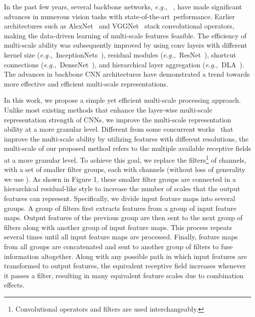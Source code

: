 \documentclass[10pt,journal,cspaper,compsoc]{IEEEtran}
\newcommand{\CheckRmv}[1]{}
\newcommand{\figref}[1]{Figure 1}\newcommand{\tabref}[1]{Table 1}\newcommand{\secref}[1]{Section 1}
\newcommand{\CheckRmv}[1]{#1}
\newcommand{\figref}[1]{Fig.~\ref{#1}}\newcommand{\tabref}[1]{Table~\ref{#1}}\newcommand{\secref}[1]{Sec.~\ref{#1}}
\newcommand{\ourM}{{Res2Net}}
\newcommand{\sArt}{{state-of-the-art~}}
\def\eg{\emph{e.g.,~}}
\begin{document}
In the past few years, several backbone networks, \eg
\cite{krizhevsky2012imagenet,simonyan2014very,szegedy2015going,he2016deep,
huang2017densely,Chollet_2017_CVPR,xie2017aggregated,chen2017dual,
yu2018deep,hu2018senet},
have made significant advances in numerous vision tasks with 
\sArt performance.
Earlier architectures such as AlexNet~\cite{krizhevsky2012imagenet} and
VGGNet~\cite{simonyan2014very} stack convolutional operators, 
making the data-driven learning of multi-scale features feasible.
The efficiency of multi-scale ability was subsequently improved by
using conv layers with different kernel size
(\eg InceptionNets~\cite{szegedy2015going,szegedy2016rethinking,
szegedy2017inception}),
residual modules (\eg ResNet~\cite{he2016deep}),
shortcut connections (\eg DenseNet~\cite{huang2017densely}),
and hierarchical layer aggregation (\eg DLA~\cite{yu2018deep}).
The advances in backbone CNN architectures have demonstrated
a trend towards more effective and efficient multi-scale representations.

\CheckRmv{
\begin{figure}[t]
  \centering
  \begin{overpic}[width=\linewidth]{figures/structure.pdf}
     \put(7.5,2.5){(a) Bottleneck block}
     \put(57,2.5){(b) \ourM~module}
  \end{overpic}
  \caption{Comparison between the bottleneck block and the proposed
  	\ourM~module (the scale dimension ).
  }\label{fig:structure}
\end{figure}
}

In this work, we propose a simple yet efficient multi-scale processing approach.
Unlike most existing methods that enhance the
layer-wise multi-scale representation strength of CNNs,
we improve the multi-scale representation ability at a more granular level.
Different from some concurrent works~\cite{chen2019drop,chen2018biglittle,cheng2019high} 
that improve the multi-scale ability
by utilizing features with different resolutions,
 the multi-scale of our proposed method refers to 
the multiple available receptive fields at a more granular level.
To achieve this goal, we replace the  filters\footnote{
Convolutional operators and filters are used interchangeably.}
of  channels, with a set of smaller filter groups, each with  channels
(without loss of generality we use ).
As shown in \figref{fig:structure},
these smaller filter groups are connected in a hierarchical residual-like style
to increase the number of scales that the output features can represent.
Specifically, we divide input feature maps into several groups.
A group of filters first extracts features from a group of input feature maps.
Output features of the previous group are then sent to
the next group of filters along with another group of input feature maps.
This process repeats several times until all input feature maps are processed.
Finally, feature maps from all groups are concatenated
and sent to another group of  filters to fuse information
altogether.
Along with any possible path in which input features are transformed to output features,
the equivalent receptive field increases whenever it passes 
a  filter,
resulting in many equivalent feature scales due to combination effects.
\end{document}
